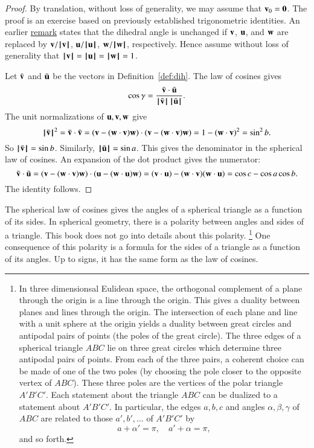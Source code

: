 \begin{proof} By translation, without loss of generality, we may
  assume that ${\mathbf v}_0={\mathbf 0}$.  The proof is an exercise based on
  previously established trigonometric identities.  An earlier
  \hyperref[rem:dih]{remark} states that the dihedral angle is
  unchanged if ${\mathbf v}$, ${\mathbf u}$, and ${\mathbf w}$ are replaced by ${\mathbf v}/{{\hskip0.1em|\hskip-0.15em|\hskip0.1em}{\mathbf v}{\hskip0.1em|\hskip-0.15em|\hskip0.1em}}$,
  ${\mathbf u}/{{\hskip0.1em|\hskip-0.15em|\hskip0.1em}{\mathbf u}{\hskip0.1em|\hskip-0.15em|\hskip0.1em}}$, ${\mathbf w}/{{\hskip0.1em|\hskip-0.15em|\hskip0.1em}{\mathbf w}{\hskip0.1em|\hskip-0.15em|\hskip0.1em}}$, respectively.  Hence assume
  without loss of generality that
  ${{\hskip0.1em|\hskip-0.15em|\hskip0.1em}{\mathbf v}{\hskip0.1em|\hskip-0.15em|\hskip0.1em}}={{\hskip0.1em|\hskip-0.15em|\hskip0.1em}{\mathbf u}{\hskip0.1em|\hskip-0.15em|\hskip0.1em}}={{\hskip0.1em|\hskip-0.15em|\hskip0.1em}{\mathbf w}{\hskip0.1em|\hskip-0.15em|\hskip0.1em}}=1$.

Let $\bar {{\mathbf v}}$ and $\bar {{\mathbf u}}$ be the vectors in Definition~\ref{def:dih}.
The law of cosines gives
\begin{displaymath}\cos\gamma = \frac{\bar {{\mathbf v}}\cdot \bar {{\mathbf u}}}
{{{\hskip0.1em|\hskip-0.15em|\hskip0.1em}\bar {{\mathbf v}}{\hskip0.1em|\hskip-0.15em|\hskip0.1em}}\,{{\hskip0.1em|\hskip-0.15em|\hskip0.1em}\bar {{\mathbf u}}{\hskip0.1em|\hskip-0.15em|\hskip0.1em}}}.
\end{displaymath}
The unit normalizations of ${\mathbf u},{\mathbf v},{\mathbf w}$ give
\begin{displaymath}
{{\hskip0.1em|\hskip-0.15em|\hskip0.1em}\bar {{\mathbf v}}{\hskip0.1em|\hskip-0.15em|\hskip0.1em}}^2 = \bar {{\mathbf v}}\cdot \bar {{\mathbf v}} =
({\mathbf v} - ({\mathbf w}\cdot {\mathbf v}){\mathbf w})\cdot ({\mathbf v} - ({\mathbf w}\cdot {\mathbf v}) {\mathbf w}) =
1 - ({\mathbf w}\cdot {\mathbf v})^2 = \sin^2 b.
\end{displaymath}
So ${{\hskip0.1em|\hskip-0.15em|\hskip0.1em}\bar {{\mathbf v}}{\hskip0.1em|\hskip-0.15em|\hskip0.1em}} =\sin b$. Similarly, ${{\hskip0.1em|\hskip-0.15em|\hskip0.1em}\bar {{\mathbf u}}{\hskip0.1em|\hskip-0.15em|\hskip0.1em}} = \sin a$.
This gives the denominator in the spherical law of cosines.  An
expansion of the dot product gives the numerator:
\begin{displaymath}
\bar {{\mathbf v}}\cdot \bar {{\mathbf u}} = ({\mathbf v} - ({\mathbf w}\cdot {\mathbf v}) {\mathbf w})\cdot ({\mathbf u} - ({\mathbf w}\cdot {\mathbf u}) {\mathbf w})
= ({\mathbf v}\cdot {\mathbf u}) - ({\mathbf w}\cdot {\mathbf v}) ({\mathbf w}\cdot {\mathbf u}) = \cos c - \cos
a \cos b.
\end{displaymath}
The identity follows.
\end{proof}

The spherical law of cosines gives the angles of a spherical triangle
as a function of its sides.  In spherical geometry, there is a
polarity between angles and sides of a triangle.  This book does not
go into details about this polarity.%
\footnote{In three dimensionsal Eulidean space, the orthogonal
  complement of a plane through the origin is a line through the
  origin.  This gives a duality between planes and lines through the
  origin.  The intersection of each plane and line with a unit sphere
  at the origin yields a duality between great circles and antipodal
  pairs of points (the poles of the great circle).  The three edges of
  a spherical triangle $ABC$ lie on three great circles which
  determine three antipodal pairs of points.  From each of the three
  pairs, a coherent choice can be made of one of the two poles (by
  choosing the pole closer to the opposite vertex of $ABC$).  These
  three poles are the vertices of the polar triangle $A'B'C'$.  Each
  statement about the triangle $ABC$ can be dualized to a statement
  about $A'B'C'$.  In particular, the edges $a,b,c$ and angles
  $\alpha,\beta,\gamma$ of $ABC$ are related to those $a',b',\ldots$
  of $A'B'C'$ by
\begin{displaymath}
a + \alpha' = \pi,\quad a' + \alpha= \pi,
\end{displaymath}
and so forth.
}  %
One
consequence of this polarity is a formula for the sides of
a triangle as a function of its angles.  Up to signs,
it has the same form as the law of cosines.
%

